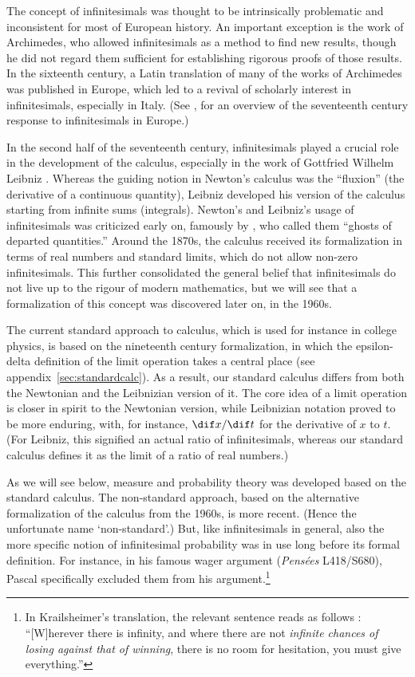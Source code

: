 The concept of infinitesimals was thought to be intrinsically problematic and inconsistent for most of European history. An important exception is the work of Archimedes, who allowed infinitesimals as a method to find new results, though he did not regard them sufficient for establishing rigorous proofs of those results. In the sixteenth century, a Latin translation of many of the works of Archimedes was published in Europe, which led to a revival of scholarly interest in infinitesimals, especially in Italy. (See \citealp{Alexander:2014}, for an overview of the seventeenth century response to infinitesimals in Europe.)

In the second half of the seventeenth century, infinitesimals played a crucial role in the development of the calculus, especially in the work of Gottfried Wilhelm Leibniz \citep[see, \textit{e.g.},][]{KatzSherry:2012a,KatzSherry:2013}.
Whereas the guiding notion in Newton's calculus was the ``fluxion'' (the derivative of a continuous quantity), Leibniz developed his version of the calculus starting from infinite sums (integrals). Newton's and Leibniz's usage of infinitesimals was criticized early on, famously by \citet{Berkeley:1734}, who called them ``ghosts of departed quantities.''
Around the 1870s, the calculus received its formalization in terms of real numbers and standard limits, which do not allow non-zero infinitesimals. This further consolidated the general belief that infinitesimals do not live up to the rigour of modern mathematics, but we will see that a formalization of this concept was discovered later on, in the 1960s.

The current standard approach to calculus, which is used for instance in college physics, is based on the nineteenth century formalization, in which the epsilon-delta definition of the limit operation takes a central place (see appendix~\ref{sec:standardcalc}). As a result, our standard calculus differs from both the Newtonian and the Leibnizian version of it. The core idea of a limit operation is closer in spirit to the Newtonian version, while Leibnizian notation proved to be more enduring, with, for instance, $\dif x/\dif t$ for the derivative of $x$ to $t$. (For Leibniz, this signified an actual ratio of infinitesimals, whereas our standard calculus defines it as the limit of a ratio of real numbers.)

As we will see below, measure and probability theory was developed based on the standard calculus. The non-standard approach, based on the alternative formalization of the calculus from the 1960s, is more recent. (Hence the unfortunate name `non-standard'.) But, like infinitesimals in general, also the more specific notion of infinitesimal probability was in use long before its formal definition. For instance, in his famous wager argument (\textit{Pens{\'e}es} L418/S680), Pascal specifically excluded them from his argument.\footnote{In Krailsheimer's translation, the relevant sentence reads as follows \citep[p.~151, my emphasis]{Krailsheimer:1995}: ``[W]herever there is infinity, and where there are not \emph{infinite chances of losing against that of winning}, there is no room for hesitation, you must give everything.''}

